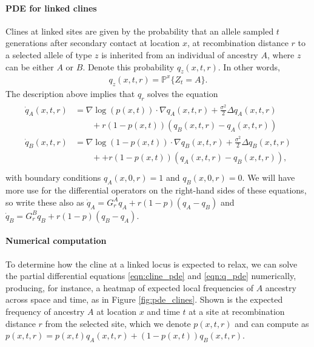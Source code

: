 \documentclass[12pt]{article}
\renewcommand{\P}{\mathbb{P}}
\newcommand{\grad}{\nabla}
\begin{document}
\paragraph{PDE for linked clines}
Clines at linked sites are given by
the probability that 
an allele sampled $t$ generations after secondary contact at location $x$,
at recombination distance $r$ to a selected allele of type $z$
is inherited from an individual of ancestry $A$,
where $z$ can be either $A$ or $B$.
Denote this probability $q_z(x,t,r)$.
In other words,
\begin{align}
    q_z(x,t,r) = \P^x \{Z_t = A\} .
\end{align}
The description above implies that $q_r$ solves the equation
\begin{align}
    \begin{aligned}  \label{eqn:q_pde}
    \dot q_A(x,t,r) 
            &= \grad \log(p(x,t)) \cdot \grad q_A(x,t,r) 
                + \frac{\sigma^2}{2} \Delta q_A(x,t,r) 
            \\ &\qquad {} + 
                r (1-p(x,t))(q_B(x,t,r)-q_A(x,t,r))  \\
    \dot q_B(x,t,r) &= \grad \log(1-p(x,t)) \cdot \grad q_B(x,t,r) 
            + \frac{\sigma^2}{2} \Delta q_B(x,t,r)
            \\ &\qquad {} + 
            + r (1-p(x,t))(q_A(x,t,r)-q_B(x,t,r))  ,
    \end{aligned} \\
\end{align}
with boundary conditions $q_A(x,0,r)=1$ and $q_B(x,0,r)=0$.
We will have more use for the differential operators on the right-hand sides of these equations,
so write these also as 
$\dot q_A = G_r^A q_A + r (1-p) (q_A-q_B)$
and 
$\dot q_B = G_r^B q_B + r (1-p) (q_B-q_A)$.

\paragraph{Numerical computation}
To determine how the cline at a linked locus is expected to relax,
we can solve the partial differential equations \eqref{eqn:cline_pde} and \eqref{eqn:q_pde} numerically,
producing, for instance, a heatmap of expected local frequencies of $A$ ancestry
across space and time, as in Figure \ref{fig:pde_clines}.
Shown is the expected frequency of ancestry $A$ at location $x$ and time $t$ at a site at recombination distance $r$ from the selected site,
which we denote $p(x,t,r)$ and can compute as $p(x,t,r) = p(x,t) q_A(x,t,r) + (1-p(x,t)) q_B(x,t,r)$.
\end{document}
